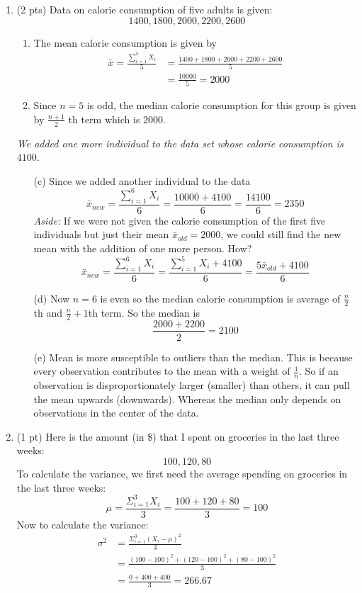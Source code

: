 \documentclass{./../../Latex/handout}
\begin{document}
\begin{enumerate}
\item (2 pts) Data on calorie consumption of five adults is given:
$$ 1400, 1800, 2000, 2200, 2600 $$
\begin{enumerate}
\item The mean calorie consumption is given by 
\begin{align*}
 \bar{x} = \frac{\sum_{i=1}^5 X_i}{5}  & = \frac{1400+1800+2000+2200+2600}{5} \\
 & = \frac{10000}{5} = 2000 
 \end{align*}
\item Since $n=5$ is odd, the median calorie consumption for this group is given by 
$ \frac{n+1}{2}$ th term which is 2000. 
\end{enumerate}
\textit{We added one more individual to the data set whose calorie consumption is $4100$.}
\begin{enumerate}
\item[(c)] Since we added another individual to the data 
$$  \bar{x}_{new} = \frac{\sum_{i=1}^6 X_i}{6} = \frac{10000+4100}{6} = \frac{14100}{6} = 2350 $$
\textit{Aside:} If we were not given the calorie consumption of the first five individuals but just their mean $\bar{x}_{old} = 2000$, we could still find the new mean with the addition of one more person. How?
$$ \bar{x}_{new} = \frac{\sum_{i=1}^6 X_i}{6} = \frac{\sum_{i=1}^5 X_i + 4100}{6} = \frac{5 \bar{x}_{old}  + 4100}{6}$$ 
\item[(d)]  Now $n=6$ is even so the median calorie consumption is average of $\frac{n}{2}$th and $\frac{n}{2}+1$th term. So the median is 
$$ \frac{2000+2200}{2} = 2100 $$
\item[(e)] Mean is more susceptible to outliers than the median. This is because every observation contributes to the mean with a weight of $\frac{1}{n}$. So if an observation is disproportionately larger (smaller) than others, it can pull the mean upwards (downwards). Whereas the median only depends on observations in the center of the data. 
\end{enumerate}

\item (1 pt) Here is the amount (in \$) that I spent on groceries in the last three weeks: 
$$ 100, 120, 80  $$
To calculate the variance, we first need the average spending on groceries in the last three weeks:
$$ \mu = \frac{\Sigma_{i=1}^3 X_i}{3} = \frac{100+120+80}{3} = 100 $$
Now to calculate the variance:
\begin{align*}
	\sigma^2 &= \frac{\Sigma_{i=1}^3 (X_i-\mu)^2}{3} \\
	&= \frac{(100-100)^2+(120-100)^2+(80-100)^2}{3} \\ 
	&= \frac{0+400+400}{3} = 266.67
\end{align*}


\end{enumerate}
\end{document}

